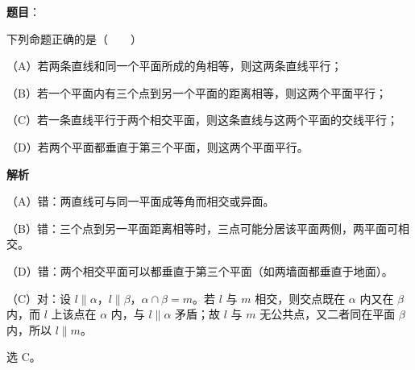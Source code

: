 \begin{answer}

\textbf{题目}：

下列命题正确的是\mbox{（　　）}

（A）若两条直线和同一个平面所成的角相等，则这两条直线平行；

（B）若一个平面内有三个点到另一个平面的距离相等，则这两个平面平行；

（C）若一条直线平行于两个相交平面，则这条直线与这两个平面的交线平行；

（D）若两个平面都垂直于第三个平面，则这两个平面平行。

\textbf{解析}

（A）错：两直线可与同一平面成等角而相交或异面。

（B）错：三个点到另一平面距离相等时，三点可能分居该平面两侧，两平面可相交。

（D）错：两个相交平面可以都垂直于第三个平面（如两墙面都垂直于地面）。

（C）对：设 $l\parallel\alpha$，$l\parallel\beta$，$\alpha\cap\beta=m$。若 $l$ 与 $m$ 相交，则交点既在 $\alpha$ 内又在 $\beta$ 内，而 $l$ 上该点在 $\alpha$ 内，与 $l\parallel\alpha$ 矛盾；故 $l$ 与 $m$ 无公共点，又二者同在平面 $\beta$ 内，所以 $l\parallel m$。

选 C。


\end{answer}
